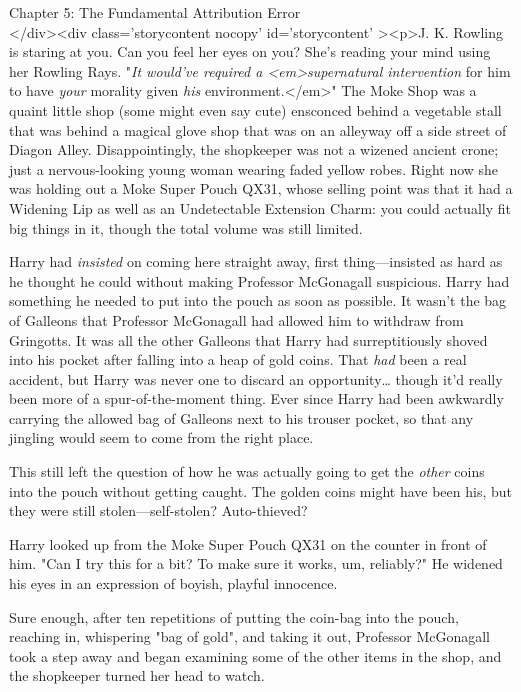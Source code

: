 
Chapter 5: The Fundamental Attribution Error\\
</div><div  class='storycontent nocopy' id='storycontent' ><p>J. K. Rowling is 
staring at you. Can you feel her eyes on you? She's reading your mind using her 
Rowling Rays.
\sbreak
"\emph{It would've required a <em>supernatural intervention} for him to have 
\emph{your} morality given \emph{his} environment.</em>"
\sbreak
The Moke Shop was a quaint little shop (some might even say cute) ensconced 
behind a vegetable stall that was behind a magical glove shop that was on an 
alleyway off a side street of Diagon Alley. Disappointingly, the shopkeeper was 
not a wizened ancient crone; just a nervous-looking young woman wearing faded 
yellow robes. Right now she was holding out a Moke Super Pouch QX31, whose 
selling point was that it had a Widening Lip as well as an Undetectable 
Extension Charm: you could actually fit big things in it, though the total 
volume was still limited.

Harry had \emph{insisted} on coming here straight away, first thing---insisted 
as hard as he thought he could without making Professor McGonagall suspicious. 
Harry had something he needed to put into the pouch as soon as possible. It 
wasn't the bag of Galleons that Professor McGonagall had allowed him to 
withdraw from Gringotts. It was all the other Galleons that Harry had 
surreptitiously shoved into his pocket after falling into a heap of gold coins. 
That \emph{had} been a real accident, but Harry was never one to discard an 
opportunity{\ldots} though it'd really been more of a spur-of-the-moment thing. 
Ever since Harry had been awkwardly carrying the allowed bag of Galleons next 
to his trouser pocket, so that any jingling would seem to come from the right 
place.

This still left the question of how he was actually going to get the 
\emph{other} coins into the pouch without getting caught. The golden coins 
might have been his, but they were still stolen---self-stolen? Auto-thieved?

Harry looked up from the Moke Super Pouch QX31 on the counter in front of him. 
"Can I try this for a bit? To make sure it works, um, reliably?" He widened his 
eyes in an expression of boyish, playful innocence.

Sure enough, after ten repetitions of putting the coin-bag into the pouch, 
reaching in, whispering "bag of gold", and taking it out, Professor McGonagall 
took a step away and began examining some of the other items in the shop, and 
the shopkeeper turned her head to watch.

